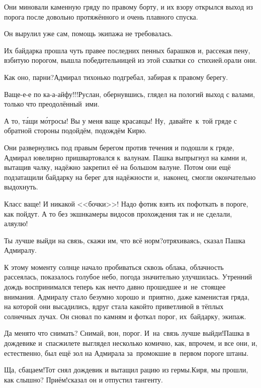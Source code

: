 Они миновали каменную гряду по правому борту, и их взору открылся выход из порога после довольно протяжённого и очень плавного спуска. 

\mdash Он вырулил уже сам, помощь экипажа не требовалась.

\mdash Их байдарка прошла чуть правее последних пенных барашков и, рассекая пену, взбитую порогом, вышла победительницей из этой схватки со~стихией.\mdash орали они.

\diagdash Как оно, парни?\mdash Адмирал тихонько подгребал, забирая к правому берегу.

\diagdash Ваще-е-е по ка-а-айфу!!!\mdash Руслан, обернувшись, глядел на пологий выход с валами, только что преодолённый~ими.

\diagdash А то, т\'{а}щи м\'{о}тросы! Вы у меня ваще красавцы! Ну,~давайте~к~той гряде с обратной стороны подойдём, подождём Кирю.

Они развернулись под правым берегом против течения и подошли к гряде, Адмирал ювелирно пришвартовался к~валунам. Пашка выпрыгнул на камни и, вытащив чалку, надёжно закрепил её на большом валуне. Потом они ещё подзатащили байдарку на берег для надёжности и,~наконец, смогли окончательно выдохнуть.

\diagdash Класс ваще! И никакой <<бочки>>! Надо фотик взять их пофоткать в пороге, как пойдут. А то без экшн\sdash камеры видосов прохождения так и не сделали, аля\sdash улю!

\diagdash Ты лучше выйди на связь, скажи им, что всё норм?\mdash отряхиваясь, сказал Пашка Адмиралу.

К этому моменту солнце начало пробиваться сквозь облака, облачность рассеялась, показалось голубое небо, погода значительно улучшилась. Утренний дождь воспринимался теперь как нечто давно прошедшее и~не~стоящее внимания. Адмиралу стало безумно хорошо и~приятно, даже каменистая гряда, на которой они высадились, вдруг стала какой\sdash то приветливой в тёплых солнечных лучах. Он сновал по камням и фоткал порог, их~байдарку, экипаж.

\diagdash Да меня\sdash то что снимать? Снимай, вон, порог. И~на~связь лучше выйди!\mdash Пашка в дождевике и~спасжилете выглядел несколько комично, как, впрочем, и все они, и, естественно, был ещё зол на Адмирала за~промокшие в~первом пороге штаны. 

\diagdash Ща, сбацаем!\mdash Тот снял дождевик и вытащил рацию из гермы.\mdash Киря, мы прошли, как слышно? Приём!\mdash сказал он и отпустил тангенту.

